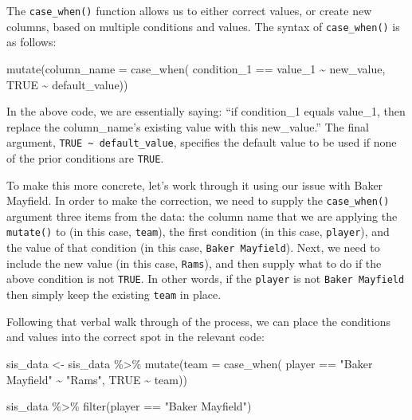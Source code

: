 \documentclass[
  letterpaper,
]{krantz}
\newenvironment{Shaded}{\begin{snugshade}}{\end{snugshade}}
\newcommand{\AttributeTok}[1]{\textcolor[rgb]{0.40,0.45,0.13}{#1}}
\newcommand{\ConstantTok}[1]{\textcolor[rgb]{0.56,0.35,0.01}{#1}}
\newcommand{\FunctionTok}[1]{\textcolor[rgb]{0.28,0.35,0.67}{#1}}
\newcommand{\NormalTok}[1]{\textcolor[rgb]{0.00,0.23,0.31}{#1}}
\newcommand{\OtherTok}[1]{\textcolor[rgb]{0.00,0.23,0.31}{#1}}
\newcommand{\SpecialCharTok}[1]{\textcolor[rgb]{0.37,0.37,0.37}{#1}}
\newcommand{\StringTok}[1]{\textcolor[rgb]{0.13,0.47,0.30}{#1}}
\begin{document}
The \texttt{case\_when()} function allows us to either correct values,
or create new columns, based on multiple conditions and values. The
syntax of \texttt{case\_when()} is as follows:

\begin{Shaded}
\begin{Highlighting}[]
\FunctionTok{mutate}\NormalTok{(}\AttributeTok{column\_name =} \FunctionTok{case\_when}\NormalTok{(}
\NormalTok{  condition\_1 }\SpecialCharTok{==}\NormalTok{ value\_1 }\SpecialCharTok{\textasciitilde{}}\NormalTok{ new\_value,}
  \ConstantTok{TRUE} \SpecialCharTok{\textasciitilde{}}\NormalTok{ default\_value))}
\end{Highlighting}
\end{Shaded}

In the above code, we are essentially saying: ``if condition\_1 equals
value\_1, then replace the column\_name's existing value with this
new\_value.'' The final argument,
\texttt{TRUE\ \textasciitilde{}\ default\_value}, specifies the default
value to be used if none of the prior conditions are \texttt{TRUE}.

To make this more concrete, let's work through it using our issue with
Baker Mayfield. In order to make the correction, we need to supply the
\texttt{case\_when()} argument three items from the data: the column
name that we are applying the \texttt{mutate()} to (in this case,
\texttt{team}), the first condition (in this case, \texttt{player}), and
the value of that condition (in this case, \texttt{Baker\ Mayfield}).
Next, we need to include the new value (in this case, \texttt{Rams}),
and then supply what to do if the above condition is not \texttt{TRUE}.
In other words, if the \texttt{player} is not \texttt{Baker\ Mayfield}
then simply keep the existing \texttt{team} in place.

Following that verbal walk through of the process, we can place the
conditions and values into the correct spot in the relevant code:

\begin{Shaded}
\begin{Highlighting}[]
\NormalTok{sis\_data }\OtherTok{\textless{}{-}}\NormalTok{ sis\_data }\SpecialCharTok{\%\textgreater{}\%}
  \FunctionTok{mutate}\NormalTok{(}\AttributeTok{team =} \FunctionTok{case\_when}\NormalTok{(}
\NormalTok{    player }\SpecialCharTok{==} \StringTok{"Baker Mayfield"} \SpecialCharTok{\textasciitilde{}} \StringTok{"Rams"}\NormalTok{,}
    \ConstantTok{TRUE} \SpecialCharTok{\textasciitilde{}}\NormalTok{ team))}

\NormalTok{sis\_data }\SpecialCharTok{\%\textgreater{}\%}
  \FunctionTok{filter}\NormalTok{(player }\SpecialCharTok{==} \StringTok{"Baker Mayfield"}\NormalTok{)}
\end{Highlighting}
\end{Shaded}
\end{document}

